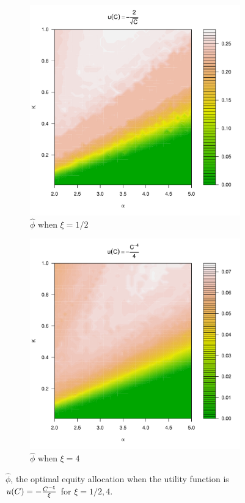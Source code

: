\documentclass{article}
\begin{document}
\begin{figure}
  \begin{subfigure}[b]{0.5\linewidth}
    \includegraphics[width=\textwidth]{phi_hat_pareto5e-1.pdf}
    \caption{$\hat\phi$ when $\xi = 1/2$}
    \label{fig:phi_hat_pareto5e-1}
  \end{subfigure}
  \begin{subfigure}[b]{0.5\linewidth}
    \includegraphics[width=\textwidth]{phi_hat_pareto4.pdf}
    \caption{$\hat\phi$ when $\xi = 4$}
    \label{fig:phi_hat_pareto4}
  \end{subfigure}
  \caption{$\hat\phi$, the optimal equity allocation when the utility
    function is $u(C) = -{C^{-\xi} \over \xi}$ for $\xi = 1/2, 4$.
  }
\end{figure}
\end{document}
